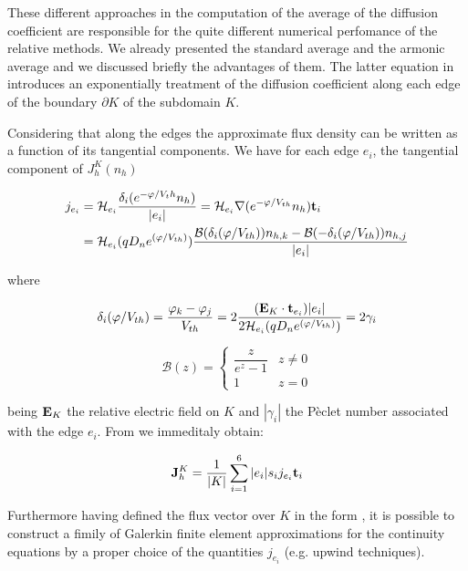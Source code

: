 These different approaches in the computation of the average of the diffusion coefficient are responsible for the quite different numerical perfomance of the relative methods.
We already presented the standard average and the armonic average and we discussed briefly the advantages of them. 
The latter equation in  introduces an exponentially treatment of the diffusion coefficient along each edge of the boundary $\partial K$ of the subdomain $K$. 

Considering that along the edges the approximate flux density can be written as a function of its tangential components. We have for each edge $e_i$, the tangential component of $J_h^K(n_h)$

\begin{align*}
j_{e_i}  & =   \mathcal{H}_{e_i} \dfrac{\delta_i(e^{-\varphi /V_th}n_h)}{|e_i|} = \mathcal{H}_{e_i} \nabla (e^{-\varphi / V_{th}}n_h) \mathbf{t}_i \\
& =  \mathcal{H}_{e_i}(qD_n e^{(\varphi/V_{th})}) \dfrac{\mathcal{B}(\delta_i(\varphi / V_{th}))n_{h,k} -  \mathcal{B}(-\delta_i(\varphi / V_{th}))n_{h,j}}{|e_i|}
\end{align*}

where 

\begin{equation}
\label{eq: peclet number}
\delta_i(\varphi / V_{th}) = \dfrac{\varphi_k - \varphi_j}{V_{th}} = 2 \dfrac{(\mathbf{E}_K\cdot \mathbf{t}_{e_i}) |e_i|}{2\mathcal{H}_{e_i}(qD_n e^{(\varphi/V_{th})}) } = 2 \gamma_i
\end{equation}

\begin{equation}
\mathcal{B}(z) = \left\{ \begin{array}{cl}
\dfrac{z}{e^z-1} & z \neq 0
\\
1 & z = 0
\end{array}
\right.
\end{equation}

being $\mathbf{E}_K$ the relative electric field on $K$ and $|\gamma_i|$ the P\`eclet number associated with the edge $e_i$. 
From  we immeditaly obtain:

\begin{equation}
\label{eq: exp fitted flux}
\mathbf{J}_h^K = \dfrac{1}{|K|}\sum_{i=1}^6 |e_i| s_i j_{e_i} \mathbf{t}_i 
\end{equation}

Furthermore having defined the flux vector over $K$ in the form , it is possible to construct a fimily of Galerkin finite element approximations for the continuity equations by a proper choice of the quantities $j_{e_i}$ (e.g. upwind techniques). 




